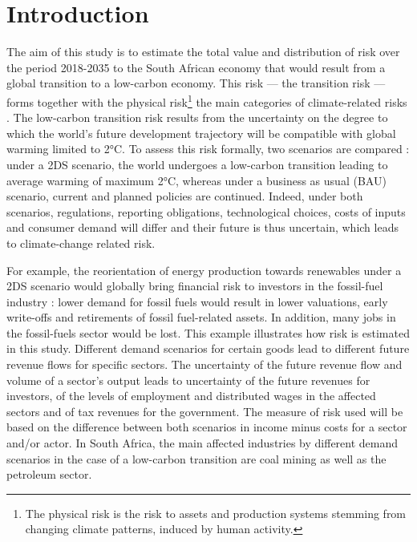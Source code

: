 \documentclass[12pt,english]{article}
\begin{document}
\begin{abstract}


\end{abstract}

\tableofcontents

\section{Introduction}

The aim of this study is to estimate %
the total value and distribution of risk over the period 2018-2035 to the South African economy that would result from a global transition to a low-carbon economy. This risk --- the transition risk --- forms together with the physical risk\footnote{The physical risk is the risk to assets and production systems stemming from changing climate patterns, induced by human activity.} the main categories of climate-related risks %
\citep{board2017recommendations}. The low-carbon transition risk results from the uncertainty on the degree to which the world's future development trajectory will be compatible with global warming limited to 2°C. To assess this risk formally, two scenarios are compared : under a 2DS scenario, the world undergoes a low-carbon transition leading to average warming of maximum 2°C, whereas under a business as usual (BAU) scenario, current and planned policies are continued. Indeed, under both scenarios, regulations, reporting obligations, technological choices, costs of inputs and consumer demand will differ and their future is thus uncertain, which leads to climate-change related risk. %

For example, the reorientation of energy production towards renewables under a 2DS scenario would globally bring financial risk to investors in the fossil-fuel industry : lower demand for fossil fuels would result in lower valuations, early write-offs and retirements of fossil fuel-related assets. In addition, many jobs in the fossil-fuels sector would be lost. This example illustrates how risk is estimated in this study. Different demand scenarios for certain goods lead to different future revenue flows for specific sectors. The uncertainty of the future revenue flow and volume of a sector's output leads to uncertainty of the future revenues for investors, of the levels of employment and distributed wages in the affected sectors and of tax revenues for the government. The measure of risk used will be based on the difference between both scenarios in income minus costs for a sector and/or actor. In South Africa, the main affected industries by different demand scenarios in the case of a low-carbon transition are coal mining %
as well as the petroleum sector.
\end{document}
